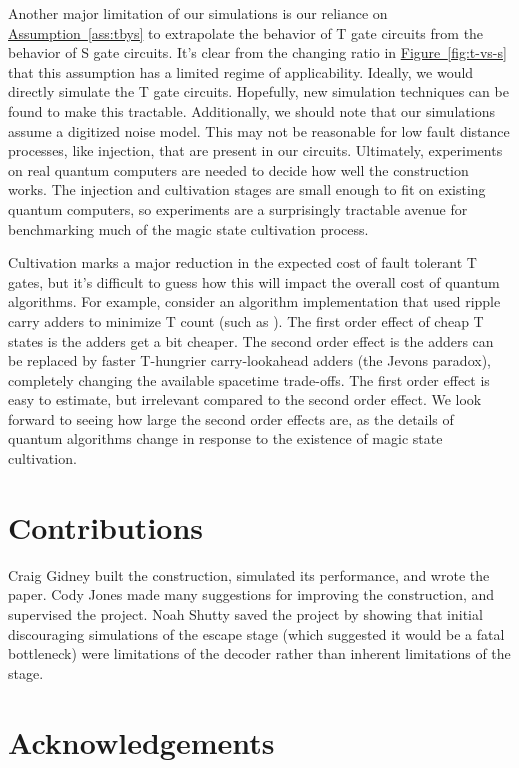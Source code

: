 \documentclass[onecolumn,unpublished,a4paper]{quantumarticle}
\theoremstyle{definition}
\newcommand{\ass}[1]{\hyperref[ass:#1]{Assumption~\ref*{ass:#1}}}
\newcommand{\fig}[1]{\hyperref[fig:#1]{Figure~\ref*{fig:#1}}}
\begin{document}
Another major limitation of our simulations is our reliance on \ass{tbys} to extrapolate the behavior of T gate circuits from the behavior of S gate circuits.
It's clear from the changing ratio in \fig{t-vs-s} that this assumption has a limited regime of applicability.
Ideally, we would directly simulate the T gate circuits.
Hopefully, new simulation techniques can be found to make this tractable.
Additionally, we should note that our simulations assume a digitized noise model.
This may not be reasonable for low fault distance processes, like injection, that are present in our circuits.
Ultimately, experiments on real quantum computers are needed to decide how well the construction works.
The injection and cultivation stages are small enough to fit on existing quantum computers, so experiments are a surprisingly tractable avenue for benchmarking much of the magic state cultivation process.

Cultivation marks a major reduction in the expected cost of fault tolerant T gates, but it's difficult to guess how this will impact the overall cost of quantum algorithms.
For example, consider an algorithm implementation that used ripple carry adders to minimize T count (such as \cite{gidney2021factor}).
The first order effect of cheap T states is the adders get a bit cheaper.
The second order effect is the adders can be replaced by faster T-hungrier carry-lookahead adders (the Jevons paradox), completely changing the available spacetime trade-offs.
The first order effect is easy to estimate, but irrelevant compared to the second order effect.
We look forward to seeing how large the second order effects are, as the details of quantum algorithms change in response to the existence of magic state cultivation.


\section{Contributions}

Craig Gidney built the construction, simulated its performance, and wrote the paper.
Cody Jones made many suggestions for improving the construction, and supervised the project.
Noah Shutty saved the project by showing that initial discouraging simulations of the escape stage (which suggested it would be a fatal bottleneck) were limitations of the decoder rather than inherent limitations of the stage.

\section{Acknowledgements}
\end{document}
